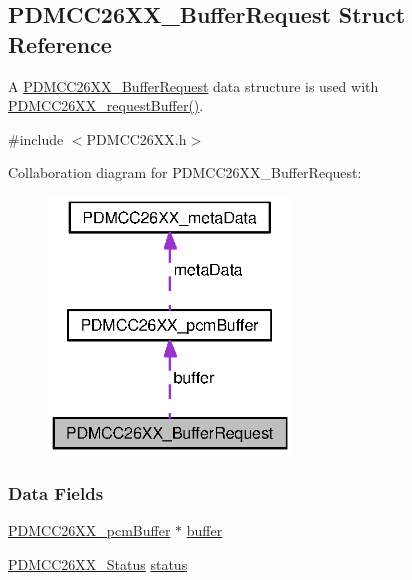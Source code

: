 \subsection{P\+D\+M\+C\+C26\+X\+X\+\_\+\+Buffer\+Request Struct Reference}
\label{struct_p_d_m_c_c26_x_x___buffer_request}


A \hyperlink{struct_p_d_m_c_c26_x_x___buffer_request}{P\+D\+M\+C\+C26\+X\+X\+\_\+\+Buffer\+Request} data structure is used with \hyperlink{_p_d_m_c_c26_x_x_8h_a15a0017513c13ca244f7e3a0f5761e8d}{P\+D\+M\+C\+C26\+X\+X\+\_\+request\+Buffer()}.  




{\ttfamily \#include $<$P\+D\+M\+C\+C26\+X\+X.\+h$>$}



Collaboration diagram for P\+D\+M\+C\+C26\+X\+X\+\_\+\+Buffer\+Request\+:
\nopagebreak
\begin{figure}[H]
\begin{center}
\leavevmode
\includegraphics[width=183pt]{struct_p_d_m_c_c26_x_x___buffer_request__coll__graph}
\end{center}
\end{figure}
\subsubsection*{Data Fields}
\begin{DoxyCompactItemize}
\item 
\hyperlink{struct_p_d_m_c_c26_x_x__pcm_buffer}{P\+D\+M\+C\+C26\+X\+X\+\_\+pcm\+Buffer} $\ast$ \hyperlink{struct_p_d_m_c_c26_x_x___buffer_request_af1ba97caba202d780151fb276b128802}{buffer}
\item 
\hyperlink{_p_d_m_c_c26_x_x_8h_afbfe993e790be75708df00186070a779}{P\+D\+M\+C\+C26\+X\+X\+\_\+\+Status} \hyperlink{struct_p_d_m_c_c26_x_x___buffer_request_aced5abcb251e52d046809a985d8e2af7}{status}
\end{DoxyCompactItemize}


